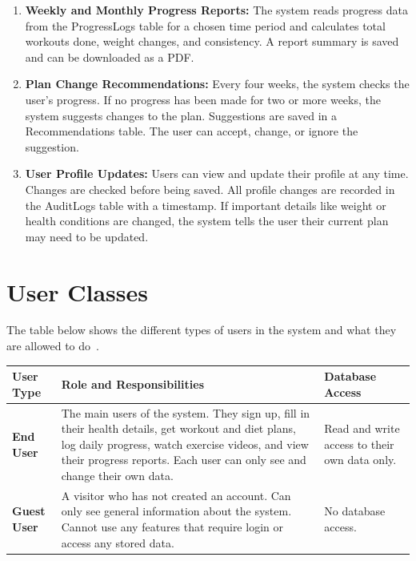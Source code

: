 \documentclass[12pt,a4paper]{article}
\begin{document}
\begin{enumerate}[leftmargin=*, label=\textbf{SF-\arabic*.}, itemsep=5pt]
  \item \textbf{Weekly and Monthly Progress Reports:}
  The system reads progress data from the ProgressLogs table for a chosen time period
  and calculates total workouts done, weight changes, and consistency. A report summary
  is saved and can be downloaded as a PDF.

  \item \textbf{Plan Change Recommendations:}
  Every four weeks, the system checks the user's progress. If no progress has been made
  for two or more weeks, the system suggests changes to the plan. Suggestions are saved
  in a Recommendations table. The user can accept, change, or ignore the suggestion.

  \item \textbf{User Profile Updates:}
  Users can view and update their profile at any time. Changes are checked before being
  saved. All profile changes are recorded in the AuditLogs table with a timestamp. If
  important details like weight or health conditions are changed, the system tells the
  user their current plan may need to be updated.

\end{enumerate}

\section{User Classes}

The table below shows the different types of users in the system and what they are allowed
to do~\cite{srs,proposal}.

\begin{center}
\begin{tabularx}{\textwidth}{>{\bfseries}p{3cm} X p{3.5cm}}
\toprule
\textbf{User Type} & \textbf{Role and Responsibilities} & \textbf{Database Access} \\
\midrule
End User &
  The main users of the system. They sign up, fill in their health details, get workout
  and diet plans, log daily progress, watch exercise videos, and view their progress
  reports. Each user can only see and change their own data. &
  Read and write access to their own data only. \\
\addlinespace
Guest User &
  A visitor who has not created an account. Can only see general information about the
  system. Cannot use any features that require login or access any stored data. &
  No database access. \\
\bottomrule
\end{tabularx}
\end{center}
\end{document}
